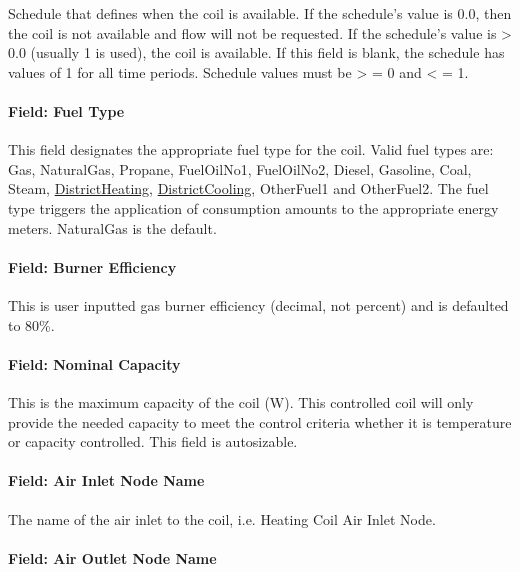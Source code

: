 Schedule that defines when the coil is available. If the schedule's value is 0.0, then the coil is not available and flow will not be requested. If the schedule's value is \textgreater{} 0.0 (usually 1 is used), the coil is available. If this field is blank, the schedule has values of 1 for all time periods. Schedule values must be \textgreater{} = 0 and \textless{} = 1.

\paragraph{Field: Fuel Type}

This field designates the appropriate fuel type for the coil. Valid fuel types are: Gas, NaturalGas, Propane, FuelOilNo1, FuelOilNo2, Diesel, Gasoline, Coal, Steam, \hyperref[districtheating]{DistrictHeating}, \hyperref[districtcooling]{DistrictCooling}, OtherFuel1 and OtherFuel2. The fuel type triggers the application of consumption amounts to the appropriate energy meters. NaturalGas is the default.

\paragraph{Field: Burner Efficiency}\label{field-gas-burner-efficiency}

This is user inputted gas burner efficiency (decimal, not percent) and is defaulted to 80\%.

\paragraph{Field: Nominal Capacity}\label{field-nominal-capacity-1-000}

This is the maximum capacity of the coil (W). This controlled coil will only provide the needed capacity to meet the control criteria whether it is temperature or capacity controlled. This field is autosizable.

\paragraph{Field: Air Inlet Node Name}\label{field-air-inlet-node-name-6}

The name of the air inlet to the coil, i.e. Heating Coil Air Inlet Node.

\paragraph{Field: Air Outlet Node Name}\label{field-air-outlet-node-name-6-000}

